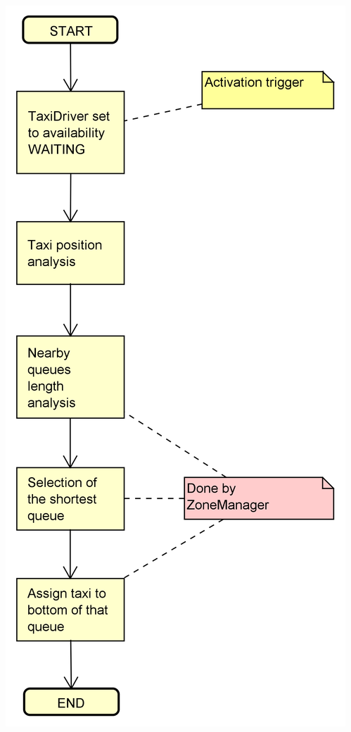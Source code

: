 \documentclass[a4paper,11pt]{report} %
\begin{document}
\begin{minipage}{\linewidth}
{		\includegraphics[keepaspectratio=true,scale=0.7]{Pictures/ZoneAssignment}}
	\end{minipage}	
	
	\pagebreak
	
\end{document}
